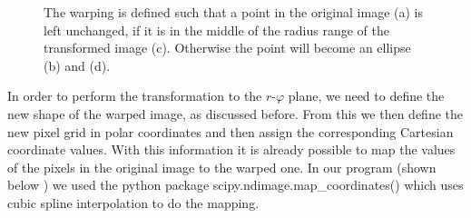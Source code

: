\begin{figure}[H]
	\centering
\caption{The warping is defined such that a point in the original image (a) is left unchanged, if it is in the middle of the radius range of the transformed image (c). Otherwise the point will become an ellipse (b) and (d).}
\label{fig:Circle_distortion}
\end{figure}
In order to perform the transformation to the $r$-$\varphi$ plane, we need to define the new shape of the warped image, as discussed before. From this we then define the new pixel grid in polar coordinates and then assign the corresponding Cartesian coordinate values. With this information it is already possible to map the values of the pixels in the original image to the warped one. In our program (shown below \cite{ImageWarping}) we used the python package scipy.ndimage.map\_coordinates() which uses cubic spline interpolation to do the mapping.\\
